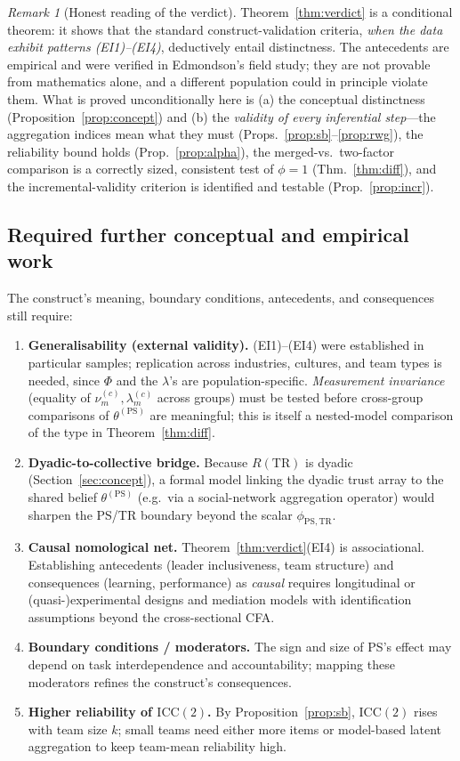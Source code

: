 \documentclass{amsart}
\theoremstyle{remark}
\newtheorem{remark}{Remark}
\begin{document}
\begin{remark}[Honest reading of the verdict]
Theorem~\ref{thm:verdict} is a conditional theorem: it shows that the standard
construct-validation criteria, \emph{when the data exhibit patterns
(EI1)--(EI4)}, deductively entail distinctness. The antecedents are empirical and
were verified in Edmondson's field study; they are not provable from mathematics
alone, and a different population could in principle violate them. What is proved
unconditionally here is (a) the conceptual distinctness
(Proposition~\ref{prop:concept}) and (b) the \emph{validity of every inferential
step}---the aggregation indices mean what they must (Props.\
\ref{prop:sb}--\ref{prop:rwg}), the reliability bound holds
(Prop.~\ref{prop:alpha}), the merged-vs.\ two-factor comparison is a correctly
sized, consistent test of $\phi=1$ (Thm.~\ref{thm:diff}), and the
incremental-validity criterion is identified and testable (Prop.~\ref{prop:incr}).
\end{remark}

\subsection*{Required further conceptual and empirical work}
The construct's meaning, boundary conditions, antecedents, and consequences still
require:
\begin{enumerate}
\item \textbf{Generalisability (external validity).} (EI1)--(EI4) were established
in particular samples; replication across industries, cultures, and team types is
needed, since $\Phi$ and the $\lambda$'s are population-specific. \emph{Measurement
invariance} (equality of $\nu^{(c)}_m,\lambda^{(c)}_m$ across groups) must be tested
before cross-group comparisons of $\theta^{(\mathrm{PS})}$ are meaningful; this is
itself a nested-model comparison of the type in Theorem~\ref{thm:diff}.
\item \textbf{Dyadic-to-collective bridge.} Because $R(\mathrm{TR})$ is dyadic
(Section~\ref{sec:concept}), a formal model linking the dyadic trust array to the
shared belief $\theta^{(\mathrm{PS})}$ (e.g.\ via a social-network aggregation
operator) would sharpen the PS/TR boundary beyond the scalar $\phi_{\mathrm{PS,TR}}$.
\item \textbf{Causal nomological net.} Theorem~\ref{thm:verdict}(EI4) is
associational. Establishing antecedents (leader inclusiveness, team structure) and
consequences (learning, performance) as \emph{causal} requires longitudinal or
(quasi-)experimental designs and mediation models with identification assumptions
beyond the cross-sectional CFA.
\item \textbf{Boundary conditions / moderators.} The sign and size of PS's effect
may depend on task interdependence and accountability; mapping these moderators
refines the construct's consequences.
\item \textbf{Higher reliability of $\mathrm{ICC}(2)$.} By
Proposition~\ref{prop:sb}, $\mathrm{ICC}(2)$ rises with team size $k$; small teams
need either more items or model-based latent aggregation to keep team-mean
reliability high.
\end{enumerate}
\end{document}
